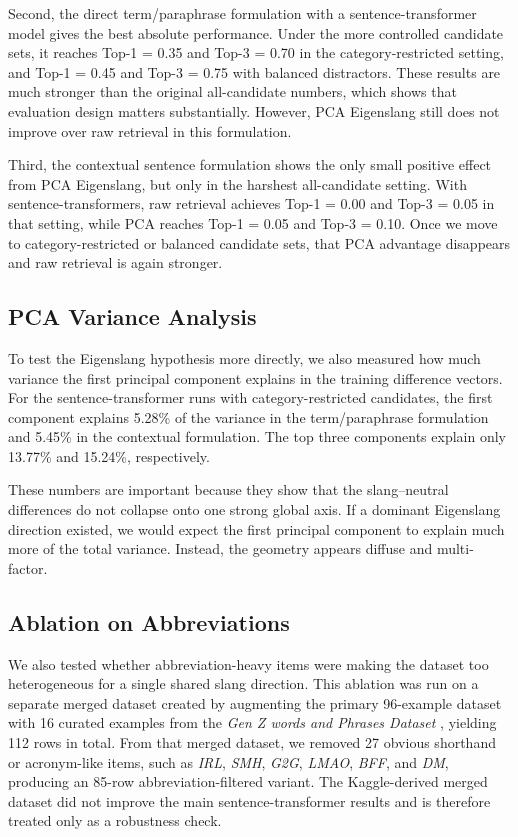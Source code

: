 \documentclass{article}
\begin{document}
Second, the direct term/paraphrase formulation with a sentence-transformer model gives the best absolute performance.
Under the more controlled candidate sets, it reaches Top-1 = 0.35 and Top-3 = 0.70 in the category-restricted setting, and Top-1 = 0.45 and Top-3 = 0.75 with balanced distractors.
These results are much stronger than the original all-candidate numbers, which shows that evaluation design matters substantially.
However, PCA Eigenslang still does not improve over raw retrieval in this formulation.

Third, the contextual sentence formulation shows the only small positive effect from PCA Eigenslang, but only in the harshest all-candidate setting.
With sentence-transformers, raw retrieval achieves Top-1 = 0.00 and Top-3 = 0.05 in that setting, while PCA reaches Top-1 = 0.05 and Top-3 = 0.10.
Once we move to category-restricted or balanced candidate sets, that PCA advantage disappears and raw retrieval is again stronger.

\subsection{PCA Variance Analysis}
To test the Eigenslang hypothesis more directly, we also measured how much variance the first principal component explains in the training difference vectors.
For the sentence-transformer runs with category-restricted candidates, the first component explains 5.28\% of the variance in the term/paraphrase formulation and 5.45\% in the contextual formulation.
The top three components explain only 13.77\% and 15.24\%, respectively.

These numbers are important because they show that the slang--neutral differences do not collapse onto one strong global axis.
If a dominant Eigenslang direction existed, we would expect the first principal component to explain much more of the total variance.
Instead, the geometry appears diffuse and multi-factor.

\subsection{Ablation on Abbreviations}
We also tested whether abbreviation-heavy items were making the dataset too heterogeneous for a single shared slang direction.
This ablation was run on a separate merged dataset created by augmenting the primary 96-example dataset with 16 curated examples from the \emph{Gen Z words and Phrases Dataset} \citep{yeasmin2026kaggle}, yielding 112 rows in total.
From that merged dataset, we removed 27 obvious shorthand or acronym-like items, such as \emph{IRL}, \emph{SMH}, \emph{G2G}, \emph{LMAO}, \emph{BFF}, and \emph{DM}, producing an 85-row abbreviation-filtered variant.
The Kaggle-derived merged dataset did not improve the main sentence-transformer results and is therefore treated only as a robustness check.
\end{document}
